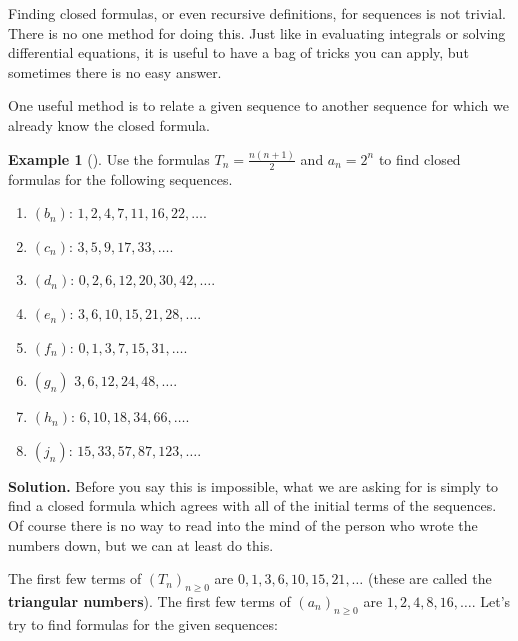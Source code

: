 \documentclass[12pt,]{book}
\newcommand{\terminology}[1]{\textbf{#1}}
\theoremstyle{plain}
\theoremstyle{definition}
\theoremstyle{definition}
\newtheorem{example}[theorem]{Example}
\theoremstyle{definition}
\numberwithin{equation}{chapter}
\begin{document}
\hypertarget{p-57}{}%
Finding closed formulas, or even recursive definitions, for sequences is not trivial. There is no one method for doing this. Just like in evaluating integrals or solving differential equations, it is useful to have a bag of tricks you can apply, but sometimes there is no easy answer.%
\par
\hypertarget{p-58}{}%
One useful method is to relate a given sequence to another sequence for which we already know the closed formula.%
\begin{example}[]\label{example-4}
\hypertarget{p-59}{}%
Use the formulas \(T_n = \frac{n(n+1)}{2}\) and \(a_n = 2^n\) to find closed formulas for the following sequences. \leavevmode%
\begin{enumerate}
\item\hypertarget{li-34}{}\hypertarget{p-60}{}%
\((b_n)\): \(1, 2, 4, 7, 11, 16, 22, \ldots \).%
\item\hypertarget{li-35}{}\hypertarget{p-61}{}%
\((c_n)\): \(3, 5, 9, 17, 33,\ldots \).%
\item\hypertarget{li-36}{}\hypertarget{p-62}{}%
\((d_n)\): \(0, 2, 6, 12, 20, 30, 42,\ldots \).%
\item\hypertarget{li-37}{}\hypertarget{p-63}{}%
\((e_n)\): \(3, 6, 10, 15, 21, 28, \ldots\).%
\item\hypertarget{li-38}{}\hypertarget{p-64}{}%
\((f_n)\): \(0, 1, 3, 7, 15, 31, \ldots \).%
\item\hypertarget{li-39}{}\hypertarget{p-65}{}%
\((g_n)\) \(3, 6, 12, 24, 48, \ldots \).%
\item\hypertarget{li-40}{}\hypertarget{p-66}{}%
\((h_n)\): \(6, 10, 18, 34, 66, \ldots \).%
\item\hypertarget{li-41}{}\hypertarget{p-67}{}%
\((j_n)\): \(15, 33, 57, 87, 123, \ldots\).%
\end{enumerate}
%
\par\smallskip%
\noindent\textbf{Solution.}\hypertarget{solution-3}{}\quad%
\hypertarget{p-68}{}%
Before you say this is impossible, what we are asking for is simply to find a closed formula which agrees with all of the initial terms of the sequences. Of course there is no way to read into the mind of the person who wrote the numbers down, but we can at least do this.%
\par
\hypertarget{p-69}{}%
The first few terms of \((T_n)_{n\ge 0}\)\label{notation-2}
 are \(0, 1, 3, 6, 10, 15, 21, \ldots\) (these are called the \terminology{triangular numbers}). The first few terms of \((a_n)_{n\ge 0}\) are \(1, 2, 4, 8, 16, \ldots\).  Let's try to find formulas for the given sequences: \leavevmode%

\end{example}
\end{document}
